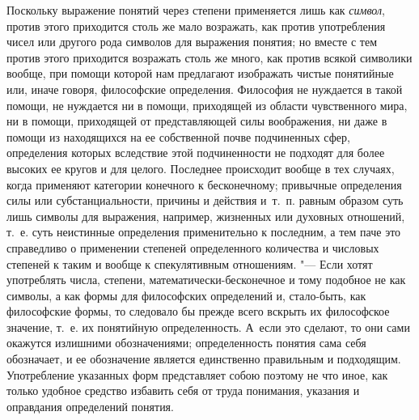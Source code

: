 Поскольку выражение понятий через степени применяется лишь как
{\em символ}, против этого приходится столь же мало
возражать, как против употребления чисел или другого рода символов для
выражения понятия; но вместе с тем против этого приходится возражать столь
же много, как против всякой символики вообще, при помощи которой нам
предлагают изображать чистые понятийные или, иначе говоря, философские
определения. Философия не нуждается в такой помощи, не нуждается ни в
помощи, приходящей из области чувственного мира, ни в помощи, приходящей от
представляющей силы воображения, ни даже в помощи из находящихся на ее
собственной почве подчиненных сфер, определения которых вследствие этой
подчиненности не подходят для более высоких ее кругов и для целого.
Последнее происходит вообще в тех случаях, когда применяют категории
конечного к бесконечному; привычные определения силы или субстанциальности,
причины и действия и~т.~п. равным образом суть лишь символы для выражения,
например, жизненных или духовных отношений, т.~е. суть неистинные
определения применительно к последним, а тем паче это справедливо о
применении степеней определенного количества и числовых степеней к таким и
вообще к спекулятивным отношениям. "--- Если хотят употреблять числа, степени,
математически-бесконечное и тому подобное не как символы, а как формы для
философских определений и, стало-быть, как философские формы, то следовало
бы прежде всего вскрыть их философское значение, т.~е. их понятийную
определенность. А~если это сделают, то они сами окажутся излишними
обозначениями; определенность понятия сама себя обозначает, и ее
обозначение является единственно правильным и подходящим. Употребление
указанных форм представляет собою поэтому не что иное, как только удобное
средство избавить себя от труда понимания, указания и оправдания
определений понятия.

\bigskip
